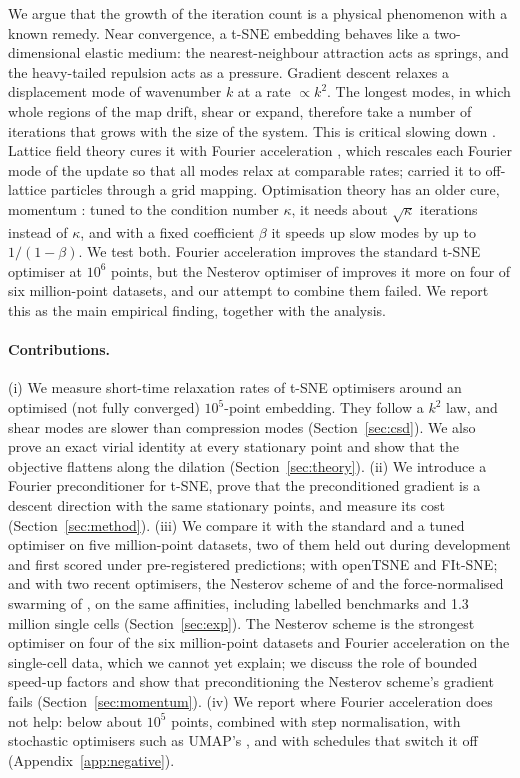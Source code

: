 \documentclass[11pt]{article}
\begin{document}
We argue that the growth of the iteration count is a physical phenomenon with a known remedy. Near
convergence, a t-SNE embedding behaves like a two-dimensional elastic medium: the nearest-neighbour
attraction acts as springs, and the heavy-tailed repulsion acts as a pressure. Gradient descent relaxes a
displacement mode of wavenumber $k$ at a rate $\propto k^2$. The longest modes, in which whole regions of the
map drift, shear or expand, therefore take a number of iterations that grows with the size of the system.
This is critical slowing down \citep{hohenberg1977}. Lattice field theory cures it with Fourier acceleration
\citep{batrouni1985}, which rescales each Fourier mode of the update so that all modes relax at comparable
rates; \citet{alexander2000} carried it to off-lattice particles through a grid mapping. Optimisation theory
has an older cure, momentum \citep{polyak1964,nesterov1983}: tuned to the condition number $\kappa$, it needs about
$\sqrt\kappa$ iterations instead of $\kappa$, and with a fixed coefficient $\beta$ it speeds up slow modes by up to
$1/(1-\beta)$. We test both. Fourier acceleration improves the standard t-SNE optimiser at $10^6$ points, but the
Nesterov optimiser of \citet{lambert2023nesterov} improves it more on four of six million-point datasets, and our
attempt to combine them failed. We report this as the main empirical finding, together with the analysis.

\paragraph{Contributions.}
(i) We measure short-time relaxation rates of t-SNE optimisers around an optimised (not fully converged)
$10^5$-point embedding. They
follow a $k^2$ law, and shear modes are slower than compression modes (Section~\ref{sec:csd}).
We also prove an exact virial identity at every stationary point and show that the objective flattens along the
dilation (Section~\ref{sec:theory}).
(ii) We introduce a Fourier preconditioner for t-SNE, prove that the preconditioned gradient is a descent direction
with the same stationary points, and measure its cost (Section~\ref{sec:method}).
(iii) We compare it with the standard and a tuned optimiser on five million-point datasets, two of them held
out during development and first scored under pre-registered predictions; with openTSNE and FIt-SNE;
and with two recent optimisers, the Nesterov scheme of \citet{lambert2023nesterov} and the force-normalised
swarming of \citet{lu2024swarming}, on the same affinities, including labelled benchmarks and 1.3 million single
cells (Section~\ref{sec:exp}). The Nesterov scheme is the strongest optimiser on four of the six million-point
datasets and Fourier acceleration on the single-cell data, which we cannot yet explain; we discuss the role of
bounded speed-up factors and show that preconditioning the Nesterov scheme's gradient fails
(Section~\ref{sec:momentum}).
(iv) We report where Fourier acceleration does not help: below about $10^5$ points, combined with step
normalisation, with stochastic optimisers such as UMAP's \citep{mcinnes2018umap}, and with schedules that switch it off
(Appendix~\ref{app:negative}).
\end{document}

